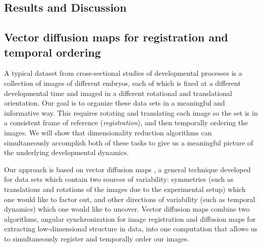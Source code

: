 \documentclass{pnastwo}
\begin{document}
\begin{article}
%
%
%
%


\section{Results and Discussion}

\subsection{Vector diffusion maps for registration and temporal ordering}

A typical dataset from cross-sectional studies of developmental processes is a collection of images of different embryos, each of which is fixed at a different developmental time and imaged in a different rotational and translational orientation.
%
Our goal is to organize these data sets in a meaningful and informative way.
%
This requires rotating and translating each image so the set is in a consistent frame of reference ({\it registration}), and then temporally ordering the images. 
%
We will show that dimensionality reduction algorithms can simultaneously accomplish both of these tasks to give us a meaningful picture of the underlying developmental dynamics. 

Our approach is based on vector diffusion maps \cite{singer2012vector}, a general technique developed for data sets which contain two sources of variability:
symmetries (such as translations and rotations of the images due to the experimental setup) which one would like to factor out, and other directions of variability (such as temporal dynamics) which one would like to uncover.
%
Vector diffusion maps combine two algorithms, angular synchronization \cite{singer2011angular} for image registration and diffusion maps \cite{coifman2005geometric} for extracting low-dimensional structure in data, into one computation that allows us to simultaneously register and temporally order our images. 
%


\end{article}
\end{document}
